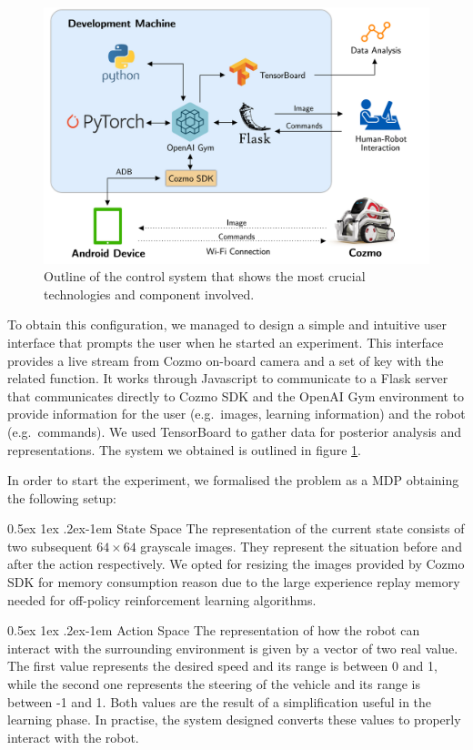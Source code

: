 \documentclass[10pt,twocolumn,letterpaper]{article}
\makeatletter
\renewcommand{\paragraph}{%
  \@startsection{paragraph}{4}%
  {\z@}{0.5ex \@plus 1ex \@minus .2ex}{-1em}%
  {\normalfont\normalsize\bfseries}%
}
\makeatother
\begin{document}
\begin{figure}[tbp]
    \centering
    \includegraphics[width=0.97\columnwidth]{cozmo-system.png}
    \caption[Outline of the control system]{Outline of the control system that shows the most crucial technologies and component involved.}
    \label{system}
\end{figure}

To obtain this configuration, we managed to design a simple and intuitive user interface that prompts the user when he started an experiment. This interface provides a live stream from Cozmo on-board camera and a set of key with the related function. It works through Javascript to communicate to a Flask server that communicates directly to Cozmo SDK and the OpenAI Gym environment to provide information for the user (e.g.\ images, learning information) and the robot (e.g.\ commands). We used TensorBoard to gather data for posterior analysis and representations. The system we obtained is outlined in figure \ref{system}.

In order to start the experiment, we formalised the problem as a MDP obtaining the following setup:

\paragraph{State Space} The representation of the current state consists of two subsequent $64 \times 64$ grayscale images. They represent the situation before and after the action respectively. We opted for resizing the images provided by Cozmo SDK for memory consumption reason due to the large experience replay memory needed for off-policy reinforcement learning algorithms.

\paragraph{Action Space} The representation of how the robot can interact with the surrounding environment is given by a vector of two real value. The first value represents the desired speed and its range is between 0 and 1, while the second one represents the steering of the vehicle and its range is between -1 and 1. Both values are the result of a simplification useful in the learning phase. In practise, the system designed converts these values to properly interact with the robot.
\end{document}
